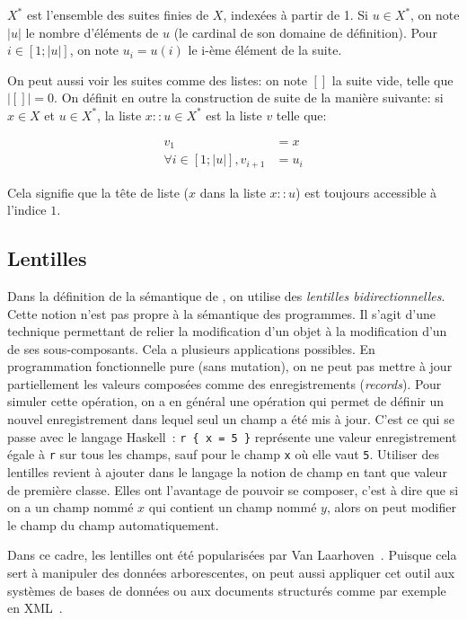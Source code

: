 $X^*$ est l'ensemble des suites finies de $X$, indexées à partir de 1. Si $u ∈
X^*$, on note $|u|$ le nombre d'éléments de $u$ (le cardinal de son domaine de
définition). Pour $i ∈ [1 ; |u|]$, on note $u_i = u(i)$ le i-ème élément de la
suite.

On peut aussi voir les suites comme des listes: on note $[]$ la suite vide,
telle que $|[]| = 0$. On définit en outre la construction de suite de la manière
suivante: si $x ∈ X$ et $u ∈ X^*$, la liste $x::u ∈ X^*$ est la liste $v$ telle
que:

\begin{align*}
                       v_1 & = x \\
  ∀ i ∈ [1; |u|] , v_{i+1} & = u_i
\end{align*}

Cela signifie que la tête de liste ($x$ dans la liste $x :: u$) est toujours
accessible à l'indice $1$.

\subsection*{Lentilles}

Dans la définition de la sémantique de \langname, on utilise des \emph{lentilles
bidirectionnelles}. Cette notion n'est pas propre à la sémantique des
programmes. Il s'agit d'une technique permettant de relier la modification d'un
objet à la modification d'un de ses sous-composants. Cela a plusieurs
applications possibles. En programmation fonctionnelle pure (sans mutation), on
ne peut pas mettre à jour partiellement les valeurs composées comme des
enregistrements (\emph{records}). Pour simuler cette opération, on a en général
une opération qui permet de définir un nouvel enregistrement dans lequel seul un
champ a été mis à jour. C'est ce qui se passe avec le langage
Haskell~: \texttt{r \{ x = 5 \}} représente une valeur
enregistrement égale à \texttt{r} sur tous les champs, sauf pour le champ
\texttt{x} où elle vaut \texttt{5}. Utiliser des lentilles revient à ajouter
dans le langage la notion de champ en tant que valeur de première classe. Elles
ont l'avantage de pouvoir se composer, c'est à dire que si on a un champ nommé
$x$ qui contient un champ nommé $y$, alors on peut modifier le champ du champ
automatiquement.

Dans ce cadre, les lentilles ont été popularisées par Van
Laarhoven~\cite{LaarhovenLenses}. Puisque cela sert à manipuler des données
arborescentes, on peut aussi appliquer cet outil aux systèmes de bases de
données ou aux documents structurés comme par exemple en
XML~\cite{PierceLenses}.

